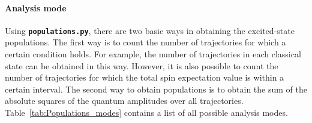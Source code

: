 \documentclass[a4paper,11pt,DIV=15,openany,twoside=false]{scrbook}
\newcommand{\ttt}[1]{\textbf{\texttt{#1}}}
\begin{document}
\paragraph{Analysis mode}

Using \ttt{populations.py}, there are two basic ways in obtaining the excited-state populations. The first way is to count the number of trajectories for which a certain condition holds. For example, the number of trajectories in each classical state can be obtained in this way. However, it is also possible to count the number of trajectories for which the total spin expectation value is within a certain interval. 
The second way to obtain populations is to obtain the sum of the absolute squares of the quantum amplitudes over all trajectories. Table~\ref{tab:Populations_modes} contains a list of all possible analysis modes.
\end{document}
